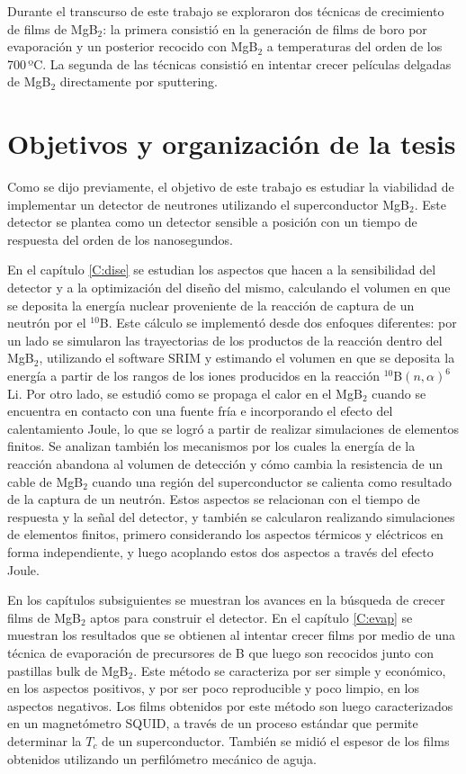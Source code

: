 Durante el transcurso de este trabajo se exploraron dos técnicas de crecimiento de films de MgB$_2$: la primera consistió en la generación de films de boro por evaporación y un posterior recocido con MgB$_2$ a temperaturas del orden de los 700\,ºC. La segunda de las técnicas consistió en intentar crecer películas delgadas de MgB$_2$ directamente por sputtering.
\section{Objetivos y organización de la tesis}\label{S:objetivos}
Como se dijo previamente, el objetivo de este trabajo es estudiar la viabilidad de implementar un detector de neutrones utilizando el superconductor MgB$_{2}$. Este detector se plantea como un detector sensible a posición con un tiempo de respuesta del orden de los nanosegundos.

En el capítulo \ref{C:dise} se estudian los aspectos que hacen a la sensibilidad del detector y a la optimización del diseño del mismo, calculando el volumen en que se deposita la energía nuclear proveniente de la reacción de captura de un neutrón por el $^{10}$B. Este cálculo se implementó desde dos enfoques diferentes: por un lado se simularon las trayectorias de los productos de la reacción dentro del MgB$_{2}$, utilizando el software SRIM y estimando el volumen en que se deposita la energía a partir de los rangos de los iones producidos en la reacción $^{10}$B$(n,\alpha)^6$Li. Por otro lado, se estudió como se propaga el calor en el MgB$_{2}$ cuando se encuentra en contacto con una fuente fría e incorporando el efecto del calentamiento Joule, lo que se logró a partir de realizar simulaciones de elementos finitos. Se analizan también los mecanismos por los cuales la energía de la reacción abandona al volumen de detección y cómo cambia la resistencia de un cable de MgB$_{2}$ cuando una región del superconductor se calienta como resultado de la captura de un neutrón. Estos aspectos se relacionan con el tiempo de respuesta y la señal del detector, y también se calcularon realizando simulaciones de elementos finitos, primero considerando los aspectos térmicos y eléctricos en forma independiente, y luego acoplando estos dos aspectos a través del efecto Joule.

En los capítulos subsiguientes se muestran los avances en la búsqueda de crecer films de MgB$_{2}$ aptos para construir el detector. En el capítulo \ref{C:evap} se muestran los resultados que se obtienen al intentar crecer films por medio de una técnica de evaporación de precursores de B que luego son recocidos junto con pastillas bulk de MgB$_{2}$. Este método se caracteriza por ser simple y económico, en los aspectos positivos, y por ser poco reproducible y poco limpio, en los aspectos negativos. Los films obtenidos por este método son luego caracterizados en un magnetómetro SQUID, a través de un proceso estándar que permite determinar la $T_c$ de un superconductor. También se midió el espesor de los films obtenidos utilizando un perfilómetro mecánico de aguja.

